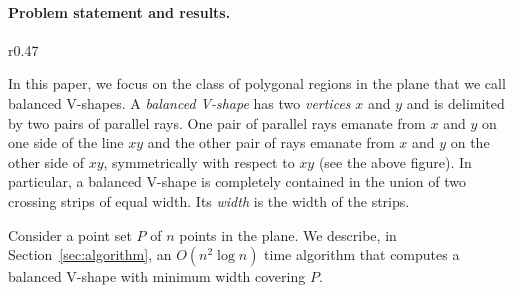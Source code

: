 \documentclass{llncs}
\begin{document}
\paragraph*{Problem statement and results.}
\begin{wrapfigure}[9]{r}{0.47\textwidth}
\end{wrapfigure}
In this paper, we focus on the class of polygonal regions in the plane
that we call balanced V-shapes.   
A \emph{balanced V-shape} has 
two \emph{vertices} $x$ and $y$ and is delimited by two pairs of
parallel rays. 
One pair of 
parallel rays emanate from $x$ and $y$ on one side of
the line $xy$ and the other pair of rays emanate from $x$ and $y$ on
the other side of $xy$, symmetrically with respect to $xy$  
(see the above figure).
In particular, a balanced V-shape is completely contained in the union
of two crossing strips of equal width.  Its \emph{width} is the width
of the strips.

Consider a point set $P$ of $n$ points in the plane.  
We describe, in Section~\ref{sec:algorithm}, an $O(n^2\log n)$ time 
algorithm that computes a balanced V-shape with minimum width covering $P$. 
\end{document}
